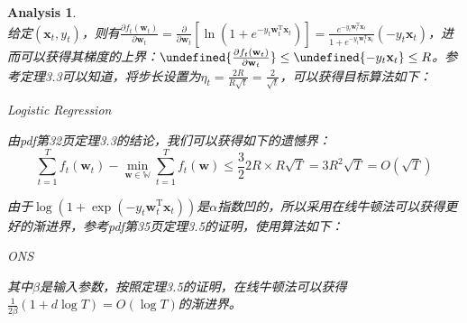 \documentclass[a4paper,UTF8]{article}
\let\norm\undefined %
\DeclarePairedDelimiter\norm{\lVert}{\rVert}
\numberwithin{equation}{section}
\newtheorem*{myAnalysis}{Analysis}
\begin{document}
\begin{myAnalysis}~\\

给定$(\mathbf{x}_t, y_t)$，则有$\frac{\partial f_t(\mathbf{w}_t)}{\partial \mathbf{w}_t} = \frac{\partial}{\partial \mathbf{w}_t} [ \ln (1 + e^{-y_t\mathbf{w}_t^\mathrm{T} \mathbf{x}_t}) ] = \frac{e^{-y_t \mathbf{w}_t^\mathrm{T} \mathbf{x}_t}}{1 + e^{-y_t \mathbf{w}_t^\mathrm{T} \mathbf{x}_t}} (-y_t \mathbf{x}_t) $，进而可以获得其梯度的上界：$\norm{\frac{\partial f_t(\mathbf{w}_t)}{\partial \mathbf{w}_t}} \le \norm{-y_t \mathbf{x}_t} \le R$。参考定理3.3可以知道，将步长设置为$\eta_t = \frac{2R}{R\sqrt{t}} = \frac{2}{\sqrt{t}}$，可以获得目标算法如下：

\begin{algorithm}  
	\caption{Logistic Regression}  
	\begin{algorithmic}[1] %
		\State{ $\mathbf{w}_{t+1} = \frac{D}{\max\{ D, \norm{\mathbf{w}_{t+1}'} \} } \mathbf{w}_{t+1}' $ }
		\EndFor  
	\end{algorithmic} 
\end{algorithm}

由pdf第32页定理3.3的结论，我们可以获得如下的遗憾界：
\[
\sum_{t=1}^T f_t(\mathbf{w}_t) - \min_{\mathbf{w} \in \mathbb{W}} \sum_{t=1}^T f_t(\mathbf{w}) \le \frac{3}{2} 2R \times R \sqrt{T} = 3R^2 \sqrt{T} = O(\sqrt{T})
\]

由于$\log(1 + \exp(-y_t \mathbf{w}_t^\mathrm{T} \mathbf{x}_t))$是$\alpha$指数凹的，所以采用在线牛顿法可以获得更好的渐进界，参考pdf第35页定理3.5的证明，使用算法如下：
\begin{algorithm}  
	\caption{ONS}  
	\begin{algorithmic}[1] %
		\EndFor  
	\end{algorithmic} 
\end{algorithm}

其中$\beta$是输入参数，按照定理3.5的证明，在线牛顿法可以获得$\frac{1}{2\beta}(1 + d \log T) = O(\log T)$的渐进界。

\end{myAnalysis}
\end{document}
